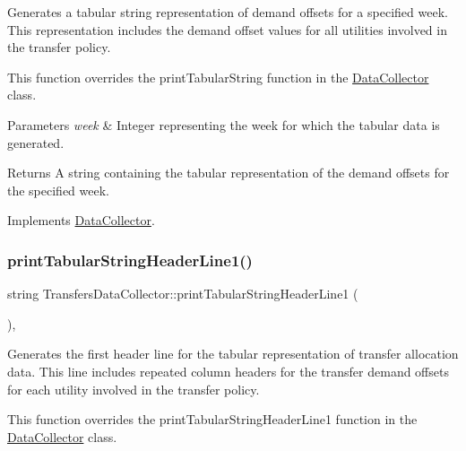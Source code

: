 Generates a tabular string representation of demand offsets for a specified week. This representation includes the demand offset values for all utilities involved in the transfer policy. 

This function overrides the {\ttfamily print\+Tabular\+String} function in the {\ttfamily \mbox{\hyperlink{classDataCollector}{Data\+Collector}}} class.


\begin{DoxyParams}{Parameters}
{\em week} & Integer representing the week for which the tabular data is generated.\\
\hline
\end{DoxyParams}
\begin{DoxyReturn}{Returns}
A string containing the tabular representation of the demand offsets for the specified week. 
\end{DoxyReturn}


Implements \mbox{\hyperlink{classDataCollector_a397fccabe0223267eea8fc7cac0e59da}{Data\+Collector}}.

\mbox{\label{classTransfersDataCollector_a7c797fbccf4326b206b29529059dd622}} 
\subsubsection{\texorpdfstring{print\+Tabular\+String\+Header\+Line1()}{printTabularStringHeaderLine1()}}
{\footnotesize\ttfamily string Transfers\+Data\+Collector\+::print\+Tabular\+String\+Header\+Line1 (\begin{DoxyParamCaption}{ }\end{DoxyParamCaption})\hspace{0.3cm}{\ttfamily [override]}, {\ttfamily [virtual]}}



Generates the first header line for the tabular representation of transfer allocation data. This line includes repeated column headers for the transfer demand offsets for each utility involved in the transfer policy. 

This function overrides the {\ttfamily print\+Tabular\+String\+Header\+Line1} function in the {\ttfamily \mbox{\hyperlink{classDataCollector}{Data\+Collector}}} class.

